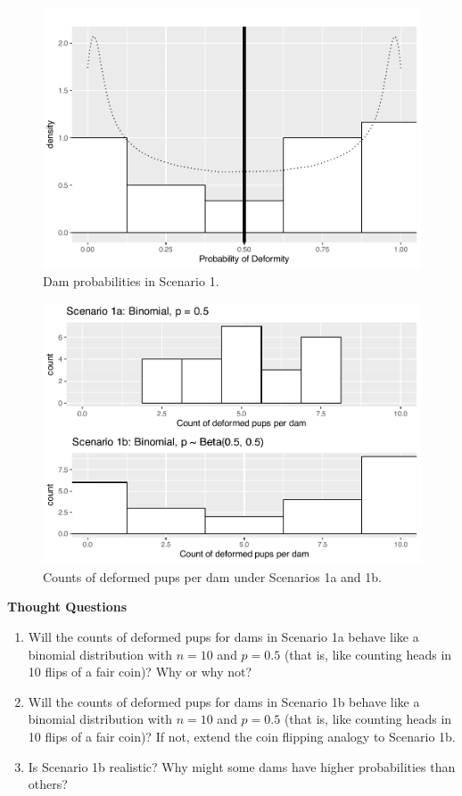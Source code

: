\documentclass[
]{krantz}
\begin{document}
\begin{figure}

{\centering \includegraphics[width=0.6\linewidth]{bookdown-BeyondMLR_files/figure-latex/scenario1ProbabilityPlot-1} 

}

\caption{Dam probabilities in Scenario 1.}\label{fig:scenario1ProbabilityPlot}
\end{figure}

\begin{figure}

{\centering \includegraphics[width=0.6\linewidth]{bookdown-BeyondMLR_files/figure-latex/scenario1Plot-1} 

}

\caption{Counts of deformed pups per dam under Scenarios 1a and 1b.}\label{fig:scenario1Plot}
\end{figure}

\vspace{5mm}

\textbf{Thought Questions}

\begin{enumerate}
\def\labelenumi{\arabic{enumi}.}
\item
  Will the counts of deformed pups for dams in Scenario 1a behave like a binomial distribution with \(n=10\) and \(p=0.5\) (that is, like counting heads in 10 flips of a fair coin)? Why or why not?
\item
  Will the counts of deformed pups for dams in Scenario 1b behave like a binomial distribution with \(n=10\) and \(p=0.5\) (that is, like counting heads in 10 flips of a fair coin)? If not, extend the coin flipping analogy to Scenario 1b.
\item
  Is Scenario 1b realistic? Why might some dams have higher probabilities than others?
\end{enumerate}
\end{document}

